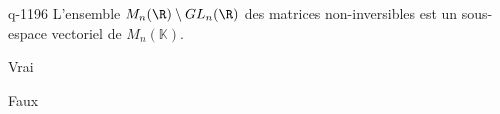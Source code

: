 \begin{truefalse}{q-1196}
L'ensemble $M_n(\R) \setminus GL_n(\R)$ des matrices non-inversibles est un sous-espace vectoriel de $M_n(\mathbb{K})$.
\item Vrai
\item* Faux
\end{truefalse}

